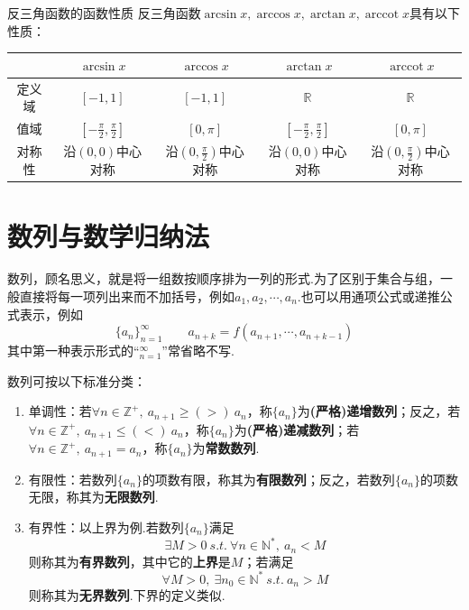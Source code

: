 \documentclass[lang=cn, zihao=4.5]{elegantbook}
\DeclareMathOperator{\arccot}{arccot}
\begin{document}
\begin{proposition}{反三角函数的函数性质}
    反三角函数$\arcsin{x},\arccos{x},\arctan{x},\arccot{x}$具有以下性质：

    \vspace{1em}
    \centering
    \renewcommand\arraystretch{1.2}
    \begin{tabular}{c|c|c|c|c}
        \hline
          & $\arcsin{x}$ & $\arccos{x}$ & $\arctan{x}$ & $\arccot{x}$ \\ \hline
        定义域 & $[-1,1]$ & $[-1,1]$ & $\mathbb{R}$ & $\mathbb{R}$ \\ \hline
        值域 & $[-\frac{\pi}{2} ,\frac{\pi}{2}]$ & $[0,\pi]$ & $[-\frac{\pi}{2},\frac{\pi}{2}]$ & $[0,\pi]$ \\ \hline
        对称性 & 沿$(0,0)$中心对称 & 沿$(0,\frac{\pi}{2})$中心对称 & 沿$(0,0)$中心对称 & 沿$(0,\frac{\pi}{2})$中心对称 \\ \hline
    \end{tabular}
    
\end{proposition}


\chapter{数列与数学归纳法}

数列，顾名思义，就是将一组数按顺序排为一列的形式.为了区别于集合与组，一般直接将每一项列出来而不加括号，例如$a_1,a_2, \cdots ,a_n$.也可以用通项公式或递推公式表示，例如
$$\{ a_n \}_{n=1}^{\infty} \qquad a_{n+k}=f(a_{n+1}, \cdots ,a_{n+k-1})$$
其中第一种表示形式的“$_{n=1}^{\infty}$”常省略不写.

数列可按以下标准分类：
\begin{enumerate}
	\item 单调性：若$\forall n \in \mathbb{Z}^+,~ a_{n+1} \geq (>)~ a_n$，称$\{ a_n \}$为\textbf{(严格)递增数列}；反之，若$\forall n \in \mathbb{Z}^+,~ a_{n+1} \leq (<)~ a_n$，称$\{ a_n \}$为\textbf{(严格)递减数列}；若$\forall n \in \mathbb{Z}^+,~ a_{n+1} = a_n$，称$\{ a_n \}$为\textbf{常数数列}.
	\item 有限性：若数列$\{ a_n \}$的项数有限，称其为\textbf{有限数列}；反之，若数列$\{ a_n \}$的项数无限，称其为\textbf{无限数列}.
	\item 有界性：以上界为例.若数列$\{ a_n \}$满足
	$$\exists M > 0 ~s.t.~ \forall n \in \mathbb{N}^{*},~ a_n<M$$
	则称其为\textbf{有界数列}，其中它的\textbf{上界}是$M$；若满足
	$$\forall M > 0 ,~ \exists n_0 \in \mathbb{N}^{*} ~s.t.~ a_n>M$$
	则称其为\textbf{无界数列}.下界的定义类似.
\end{enumerate}
\end{document}
